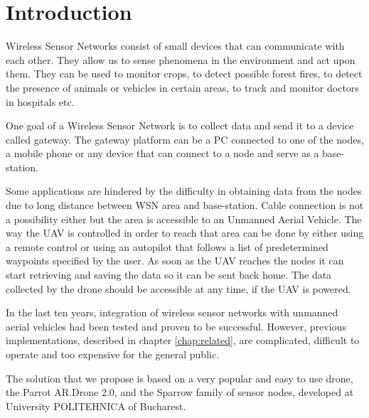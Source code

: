 \normalfont\normalsize
\chapter{Introduction}
 
Wireless Sensor Networks consist of small devices that can communicate with each other. They allow us to sense phenomena in the environment and act upon them. They can be used to monitor crops, to detect possible forest fires, to detect the presence of animals or vehicles in certain areas, to track and monitor doctors in hospitals etc. 

One goal of a Wireless Sensor Network is to collect data and send it to a device called gateway. The gateway platform can be a PC connected to one of the nodes, a mobile phone or any device that can connect to a node and serve as a base-station.


Some applications are hindered by the difficulty in obtaining data from the nodes due to long distance between WSN area and base-station. Cable connection is not a possibility either but the area is accessible to an Unmanned Aerial Vehicle. The way the UAV is controlled in order to reach that area can be done by either using a remote control or using an autopilot that follows a list of predetermined waypoints specified by the user. As soon as the UAV reaches the nodes it can start retrieving and saving the data so it can be sent back home. The data collected by the drone should be accessible at any time, if the UAV is powered.
 
In the last ten years, integration of wireless sensor networks with unmanned aerial vehicles had been tested and proven to be successful. However, previous implementations, described in chapter \ref{chap:related}, are complicated, difficult to operate and too expensive for the general public.

The solution that we propose is based on a very popular and easy to use drone, the Parrot AR.Drone 2.0, and the Sparrow family \cite{voinescu2013lightweight} of sensor nodes, developed at University POLITEHNICA of Bucharest.

